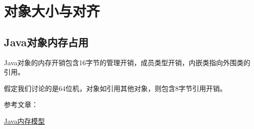 \section{对象大小与对齐}

\subsection{Java对象内存占用} 

Java对象的内存开销包含16字节的管理开销，成员类型开销，内嵌类指向外围类的引用。

假定我们讨论的是64位机，对象如引用其他对象，则包含8字节引用开销。

参考文章：

\href{http://blog.csdn.net/silentbalanceyh/article/details/4661230}{Java内存模型}










